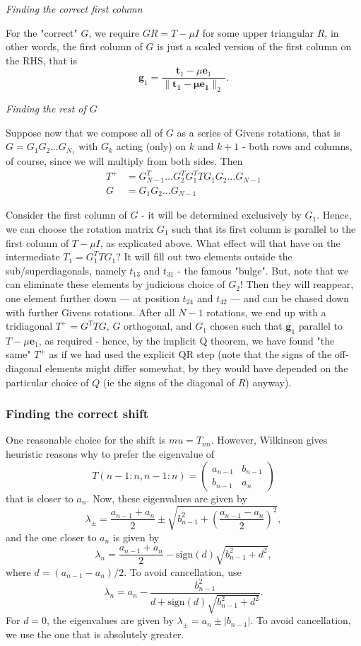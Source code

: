 \documentclass[11pt]{article}
\newcommand{\bmat}{\begin{pmatrix}}
\newcommand{\emat}{\end{pmatrix}}
\newcommand{\ve}[1]{\ensuremath{\mathbf{#1}}}
\newcommand{\tnorm}[1]{\ensuremath{\lVert{\ve{#1}}\rVert_2\,}}
\newcommand{\sign}[1]{\ensuremath{\text{sign}(#1)}}
\begin{document}
\emph{Finding the correct first column}

For the "correct" $G$, we require $GR=T - \mu I$ for some upper triangular $R$, in other words, the first column of $G$ is just a scaled version of the first column on the RHS, that is 
\begin{equation*}
	\ve g_1 = \frac{\ve t_1 - \mu \ve e_1}{\tnorm{\ve t_1 - \mu \ve e_1}}.
\end{equation*}

\emph{Finding the rest of $G$}

Suppose now that we compose all of $G$ as a series of Givens rotations, that is $G = G_1 G_2\ldots G_{N_1}$ with $G_k$ acting (only) on $k$ and $k+1$ - both rows and columns, of course, since we will multiply from both sides. Then
\begin{align*}
	T^+ &= G_{N-1}^T\ldots G_2^T G_1^T     T      G_1 G_2 \ldots G_{N-1} \\
	G &= G_1 G_2 \ldots G_{N-1}
\end{align*}

Consider the first column of $G$ - it will be determined exclusively by $G_1$. Hence, we can choose the rotation matrix $G_1$ such that its first column is parallel to the first column of $T-\mu I$, as explicated above. What effect will that have on the intermediate $T_1 = G_1^T     T      G_1$? It will fill out two elements outside the sub/superdiagonals, namely $t_{13}$ and $t_{31}$ - the famous "bulge". 
But, note that we can eliminate these elements by judicious choice of $G_2$! Then they will reappear, one element further down --- at position $t_{24}$ and $t_{42}$ --- and can be chased down with further Givens rotations. After all $N-1$ rotations, we end up with a tridiagonal $T^+ = G^TTG$, $G$ orthogonal, and $G_1$ chosen such that $\ve g_1$ parallel to $T-\mu \ve e_1$, as required - hence, by the implicit Q theorem, we have found "the same" $T^+$ as if we had used the explicit QR step (note that the signs of the off-diagonal elements might differ somewhat, by they would have depended on the particular choice of $Q$ (ie the signs of the diagonal of $R$) anyway). 

\subsubsection{Finding the correct shift}
One reasonable choice for the shift is $mu=T_{nn}$. However, Wilkinson gives heuristic reasons why to prefer the eigenvalue of 
\[
	T(n-1:n,n-1:n) = \bmat a_{n-1} & b_{n-1} \\ b_{n-1} & a_n \emat
\]
that is closer to $a_n$.
Now, these eigenvalues are given by 
\[
	\lambda_{\pm} = \frac{a_{n-1}+a_n}2 \pm \sqrt{b_{n-1}^2 + \left(\frac{a_{n-1}-a_n}2\right )^2},
\]
and the one closer to $a_n$ is given by
\[
	\lambda_{n} = \frac{a_{n-1}+a_n}2 - \sign d \sqrt{b_{n-1}^2 + d^2},
\]
where $d=(a_{n-1}-a_n)/2$. To avoid cancellation, use
\[
	\lambda_{n} = a_n - \frac{ b_{n-1}^2}{d + \sign d \sqrt{b_{n-1}^2 + d^2}}.
\]
For $d=0$, the eigenvalues are given by 	$\lambda_{\pm} = a_n \pm | b_{n-1}|$. To avoid cancellation, we use the one that is absolutely greater.
\end{document}
